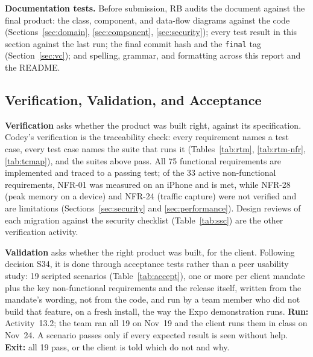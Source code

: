 \documentclass[12pt,letterpaper]{article}
\begin{document}
\textbf{Documentation tests.} Before submission, RB audits the document against the
final product: the class, component, and data-flow diagrams against the code
(Sections~\ref{sec:domain}, \ref{sec:component}, \ref{sec:security}); every test
result in this section against the last run; the final commit hash and the
\texttt{final} tag (Section~\ref{sec:vc}); and spelling, grammar, and formatting
across this report and the README.

\subsection{Verification, Validation, and Acceptance}\label{sec:acceptance}
\textbf{Verification} asks whether the product was built right, against its
specification. Codey's verification is the traceability check: every requirement
names a test case, every test case names the suite that runs it
(Tables~\ref{tab:rtm}, \ref{tab:rtm-nfr}, \ref{tab:tcmap}), and the suites above
pass. All 75 functional requirements are implemented and traced to a passing test;
of the 33 active non-functional requirements, NFR-01 was measured on an iPhone and
is met, while NFR-28 (peak memory on a device) and NFR-24 (traffic capture) were not
verified and are limitations (Sections~\ref{sec:security} and
\ref{sec:performance}). Design reviews of each migration against the security
checklist (Table~\ref{tab:ssc}) are the other verification activity.

\textbf{Validation} asks whether the right product was built, for the client.
Following decision S34, it is done through acceptance tests rather than a peer
usability study: 19 scripted scenarios (Table~\ref{tab:accept}), one or more per
client mandate plus the key non-functional requirements and the release itself,
written from the mandate's wording, not from the code, and run by a team member who
did not build that feature, on a fresh install, the way the Expo demonstration runs.
\textbf{Run:} Activity~13.2; the team ran all 19 on Nov~19 and the client runs them in
class on Nov~24. A scenario passes only if every expected result is seen without help.
\textbf{Exit:} all 19 pass, or the client is told which do not and why.
\end{document}
